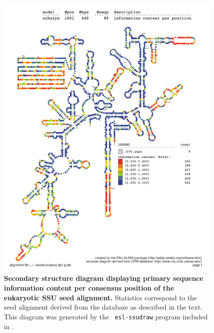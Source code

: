 \begin{figure}
\begin{center}
\includegraphics[width=5.7in]{Figures/eukarya-0p1-info}
\end{center}
\caption[Secondary structure diagram displaying primary sequence
  information content per consensus position of the eukaryotic SSU seed
  alignment]{\textbf{Secondary structure diagram displaying primary
  sequence information content per consensus position of the eukaryotic SSU seed
  alignment.} Statistics correspond to the  seed
  alignment derived from the  database \cite{CannoneGutell02}
  as described in the text. This diagram was generated by the {\tt
  esl-ssudraw} program included in .}
\label{fig:eukinfo}
\end{figure}


